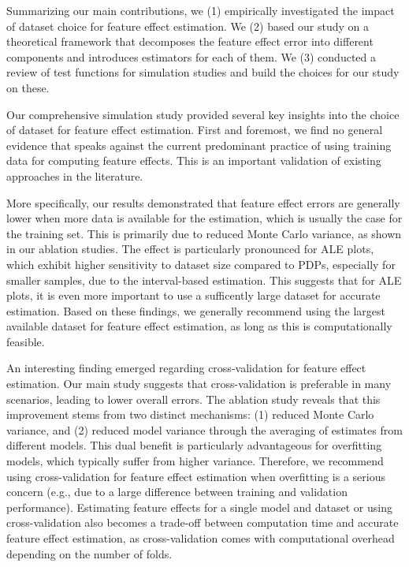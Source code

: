 \documentclass[runningheads]{llncs}
\begin{document}
Summarizing our main contributions, we (1) empirically investigated the
impact of dataset choice for feature effect estimation. We (2) based our study on
a theoretical framework that decomposes the feature effect error into different
components and introduces estimators for each of them. We (3) conducted a
review of test functions for simulation studies and build the choices for
our study on these.

Our comprehensive simulation study provided several key insights into
the choice of dataset for feature effect estimation. First and foremost,
we find no general evidence that speaks against the current predominant practice
of using training data for computing feature effects. This is an important validation
of existing approaches in the literature.

More specifically, our results demonstrated that feature effect errors are
generally lower when more data is available for the estimation, which is usually
the case for the training set. This is primarily due to reduced Monte Carlo variance,
as shown in our ablation studies. The effect is particularly pronounced for ALE plots,
which exhibit higher sensitivity to dataset size compared to PDPs, especially for smaller samples,
due to the interval-based estimation. This suggests that for ALE plots, it is even more
important to use a sufficently large dataset for accurate estimation. Based on these
findings, we generally recommend using the largest available dataset for feature effect
estimation, as long as this is computationally feasible.

An interesting finding emerged regarding cross-validation for feature effect estimation.
Our main study suggests that cross-validation is preferable in many scenarios,
leading to lower overall errors. The ablation study reveals that this improvement stems from two distinct mechanisms:
(1) reduced Monte Carlo variance, and (2) reduced model variance through the averaging of estimates from different models.
This dual benefit is particularly advantageous for overfitting models, which typically suffer
from higher variance. Therefore, we recommend using cross-validation for feature effect estimation
when overfitting is a serious concern (e.g., due to a large difference between training
and validation performance). Estimating feature effects for a single model and dataset
or using cross-validation also becomes a trade-off between computation time and accurate
feature effect estimation, as cross-validation comes with computational overhead depending
on the number of folds.
\end{document}
